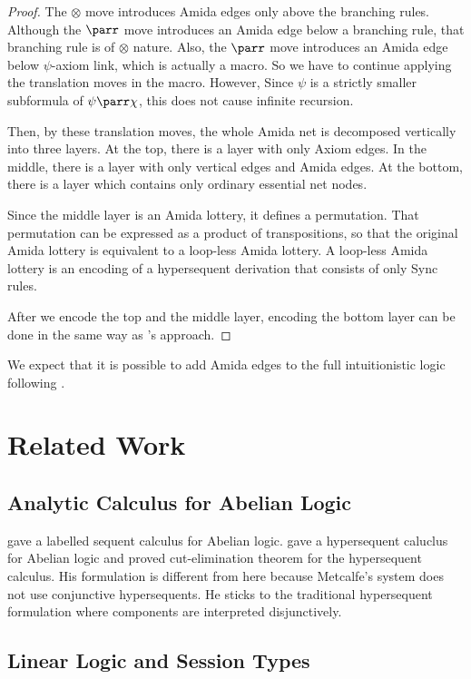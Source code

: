 \begin{proof}
The $\otimes$ move introduces Amida edges only above the branching rules.
Although the $\parr$ move introduces an Amida edge below a
branching rule, that branching rule is of $\otimes$ nature.
Also, the $\parr$ move introduces an Amida edge below $\psi$-axiom link,
which is actually a macro.  So we have to continue applying the
translation moves in the macro.  However, Since $\psi$ is a strictly
smaller subformula of $\psi\parr\chi$, this does not cause infinite
recursion.

Then, by these translation moves,
the whole Amida net is decomposed vertically into three layers.
At the top, there is a layer with only Axiom edges.
In the middle, there is a layer with only vertical edges and Amida
edges.
At the bottom, there is a layer which contains only ordinary
essential net nodes.

Since the middle layer is an Amida lottery, it defines a permutation.
That permutation can be expressed as a product of transpositions, so
that
the original Amida lottery is equivalent to a loop-less Amida lottery.
A loop-less Amida lottery is an encoding of a hypersequent derivation
that consists of only Sync rules.

After we encode the top and the middle layer, encoding the bottom layer
can be done in the same way as \citet{lamarche2008}'s approach.
 \end{proof}

We expect that it is possible to add Amida edges to
the full intuitionistic logic following
\citet{lamarche2008}.


\section{Related Work}

\subsection{Analytic Calculus for Abelian Logic}

\citet{metcalfe2002} gave a labelled sequent calculus for Abelian logic.
\citet{metcalfe2006} gave a hypersequent caluclus for Abelian logic and
proved cut-elimination theorem for the hypersequent calculus.
His formulation is different from here because Metcalfe's system does
not use conjunctive hypersequents.  He sticks to the traditional
hypersequent formulation where components are interpreted disjunctively.

\subsection{Linear Logic and Session Types}

